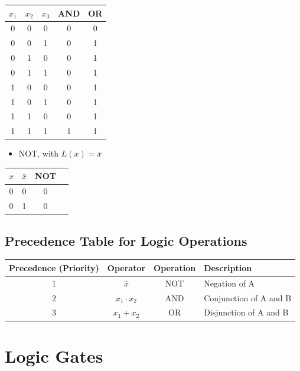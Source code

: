\documentclass[12pt,openany, tikz,border=10pt]{book}
\begin{document}
\begin{center}
\begin{tabular}{ c c c | c | c }

  \( x_1 \) & \( x_2 \) & \( x_3 \) & AND & OR \\
  \hline
  0 & 0 & 0 & 0 & 0 \\
  0 & 0 & 1 & 0 & 1 \\
  0 & 1 & 0 & 0 & 1 \\
  0 & 1 & 1 & 0 & 1 \\
  1 & 0 & 0 & 0 & 1 \\
  1 & 0 & 1 & 0 & 1 \\
  1 & 1 & 0 & 0 & 1 \\
  1 & 1 & 1 & 1 & 1 \\
\end{tabular}
\end{center}
\begin{itemize}
\item[] NOT, with $L(x) = \bar{x}$      
\end{itemize}
\begin{center}
    \begin{tabular}{ c c | c | c }
        \( x \) & \( \bar{x} \) & NOT \\
        \hline
        0 & 0 & 0 \\
        0 & 1 & 0 \\
    \end{tabular}
  \end{center}

  \subsection*{Precedence Table for Logic Operations}

  \begin{center}
    \begin{tabular}{cccl}
    \toprule
    \textbf{Precedence (Priority)} & \textbf{Operator} & \textbf{Operation} & \textbf{Description} \\
    \midrule
    1 & \(\overline{x}\) & NOT & Negation of A \\
    2 & \(x_{1} \cdot x_{2}\) & AND & Conjunction of A and B \\
    3 & \(x_{1} + x_{2}\) & OR & Disjunction of A and B \\
    \bottomrule
    \end{tabular}
    \end{center}

    \section{Logic Gates}
    \vspace*{10px}
\end{document}
